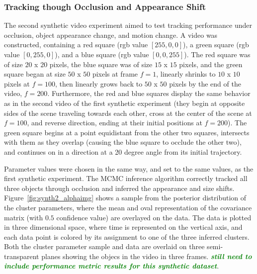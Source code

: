 \documentclass[smallcondensed, final]{svjour3}
\newcommand{\willie}[1]{\textcolor{green}{\textsf{\emph{\textbf{\textcolor{green}{#1}}}}}}
\begin{document}
\subsubsection{Tracking though Occlusion and Appearance Shift}

The second synthetic video experiment aimed to test tracking performance under occlusion, object appearance change, and motion change. A video was constructed, containing a red square (rgb value $[255,0,0]$), a green square (rgb value $[0,255,0]$), and a blue square (rgb value $[0,0,255]$). The red square was of size $20$ x $20$ pixels, the blue square was of size $15$ x $15$ pixels, and the green square began at size $50$ x $50$ pixels at frame $f=1$, linearly shrinks to $10$ x $10$ pixels at $f=100$, then linearly grows back to $50$ x $50$ pixels by the end of the video, $f=200$. Furthermore, the red and blue squares display the same behavior as in the second video of the first synthetic experiment (they begin at opposite sides of the scene traveling towards each other, cross at the center of the scene at $f=100$, and reverse direction, ending at their initial positions at $f=200$). The green square begins at a point equidistant from the other two squares, intersects with them as they overlap (causing the blue square to occlude the other two), and continues on in a direction at a 20 degree angle from its initial trajectory.

Parameter values were chosen in the same way, and set to the same values, as the first synthetic experiment. The MCMC inference algorithm correctly tracked all three objects through occlusion and inferred the appearance and size shifts. Figure~\ref{fig:synth2_alphaimg} shows a sample from the posterior distribution of the cluster parameters, where the mean and oval representation of the covariance matrix (with $0.5$ confidence value) are overlayed on the data. The data is plotted in three dimensional space, where time is represented on the vertical axis, and each data point is colored by its assignment to one of the three inferred clusters. Both the cluster parameter sample and data are overlaid on three semi-transparent planes showing the objecs in the video in three frames. \willie{still need to include performance metric results for this synthetic dataset}.

\end{document}
